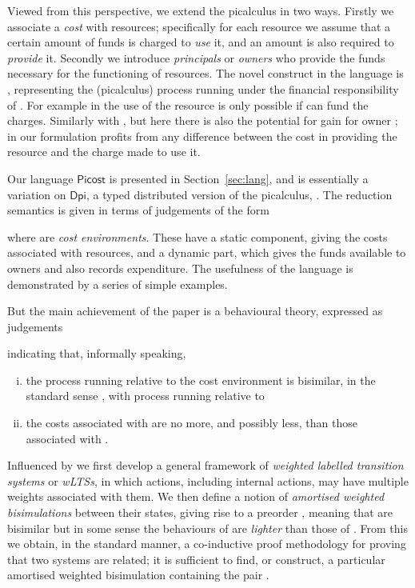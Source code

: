 \documentclass{LMCS}
\newcommand{\pfn}[1]{\mathsf{#1}}  \newcommand{\cfn}[1]{\mathsf{#1}}  \newcommand{\ownfnt}[1]{{\mathsf{#1}}}
\newcommand{\DPI}{\ensuremath{\pfn{Dpi}}\xspace}
\newcommand{\picost}{\ensuremath{\pfn{Picost}}\xspace}
\begin{document}
Viewed from this perspective, we extend the picalculus in two ways.
Firstly we associate a \emph{cost} with resources; specifically for
each resource we assume that a certain amount of funds  is
charged to \emph{use} it, and an amount  is also required to
\emph{provide} it. Secondly we introduce \emph{principals} or \emph{owners}
who provide the funds necessary for the functioning of resources. 
The novel construct in the language is , representing
the (picalculus) process  running under the financial responsibility 
of . For example in  the use of the resource 
 is only possible if  can fund the charges. Similarly with
 , but here there is also the potential for gain
for owner ; in our formulation  profits from 
any difference between the cost in providing the resource and the 
charge made to use it. 

Our language \picost is presented in Section~\ref{sec:lang}, and is essentially 
a variation on \DPI, a typed distributed version of the picalculus, \cite{dpibook}.
The reduction semantics is given in terms of judgements of the form

where  are \emph{cost environments}. These have a static component, giving
the costs associated with resources, and a dynamic part, which gives the funds available to owners 
and also records expenditure. The usefulness of the language is demonstrated by a series of 
simple examples. 

But the main achievement of the paper is a  behavioural theory, expressed as judgements

indicating that, informally speaking,
\begin{enumerate}[(i)]
\item the process  running relative to the cost environment  is bisimilar, in the
standard sense \cite{ccs}, with process  running relative to 

\item the costs associated with  are no more, and possibly less,  than those
associated with .
\end{enumerate}


 \noindent Influenced by \cite{astrid} we first develop a general framework of
\emph{weighted labelled transition systems} or \emph{wLTSs}, in which
actions, including internal actions, may have multiple weights
associated with them. We then define a notion of \emph{amortised
  weighted bisimulations} between their states, giving rise to a
preorder , meaning that  are bisimilar but in some
sense the behaviours of  are \emph{lighter} than those of . From
this we obtain, in the standard manner, a co-inductive proof
methodology for proving that two systems are related; it is sufficient
to find, or construct, a particular amortised weighted bisimulation 
containing the pair . 
\end{document}
